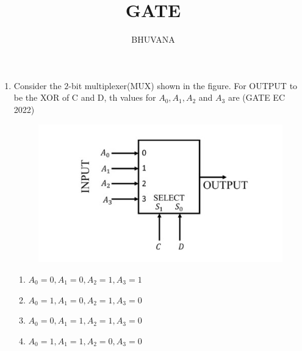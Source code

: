 \documentclass{article}
\begin{document}
 \title{GATE}
 \author{BHUVANA}
 \maketitle

 \begin{enumerate}
 \item

	 Consider the $2$-bit multiplexer(MUX) shown in the figure. For OUTPUT to be the XOR of C and D, th values for $A_0,A_1,A_2$ and $A_3$  are \underline{\hspace{20pt}}  \hfill(GATE EC 2022)
	

	 \begin{figure}[h]
		 \centering
		 \includegraphics[width=\columnwidth]{pics/gatepic.jpg}
		 \label{fig:MUX}
	\end{figure}
	 \begin{enumerate}[label=(\Alph*)]
		\item $A_0=0,A_1=0,A_2=1,A_3=1$
		\item $A_0=1,A_1=0,A_2=1,A_3=0$
		\item $A_0=0,A_1=1,A_2=1,A_3=0$
		\item $A_0=1,A_1=1,A_2=0,A_3=0$
	\end{enumerate}
		 
 \end{enumerate}
\end{document}
